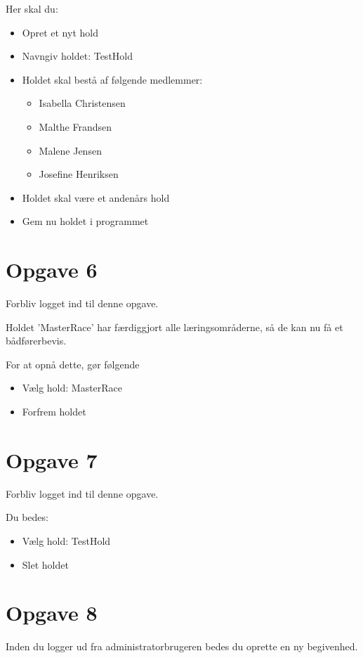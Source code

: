 Her skal du:
\begin{itemize}
		\item Opret et nyt hold
		\item Navngiv holdet: TestHold
		\item Holdet skal bestå af følgende medlemmer: 
		\begin{itemize}
			\item Isabella Christensen
			\item Malthe Frandsen
			\item Malene Jensen
			\item Josefine Henriksen
		\end{itemize}
		\item Holdet skal være et andenårs hold 		
		\item Gem nu holdet i programmet
\end{itemize}

\section{Opgave 6}

Forbliv logget ind til denne opgave.

Holdet 'MasterRace'  har færdiggjort alle læringsområderne, så de kan nu få et bådførerbevis.

For at opnå dette, gør følgende
\begin{itemize}
\item Vælg hold: MasterRace
\item Forfrem holdet
\end{itemize}


\section{Opgave 7}

Forbliv logget ind til denne opgave.

Du bedes:
\begin{itemize}
\item Vælg hold: TestHold
\item Slet holdet
\end{itemize}


\section{Opgave 8}

Inden du logger ud fra administratorbrugeren bedes du oprette en ny begivenhed.

